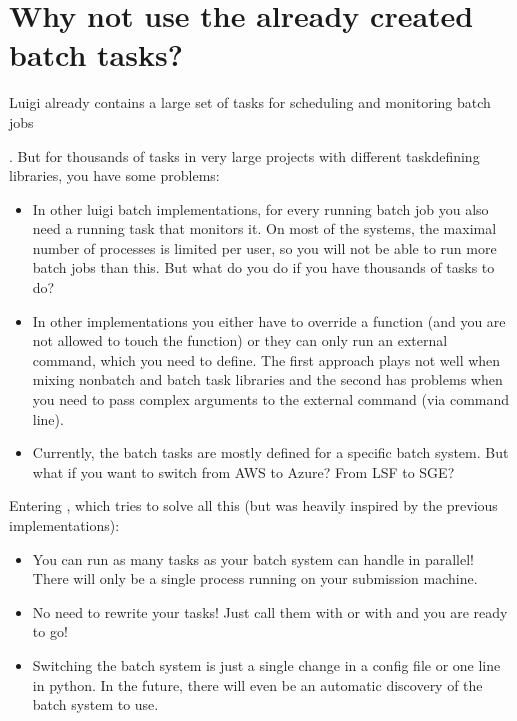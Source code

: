 \documentclass[letterpaper,10pt,english]{sphinxmanual}
\begin{document}
\chapter{Why not use the already created batch tasks?}
\label{\detokenize{index:why-not-use-the-already-created-batch-tasks}}
Luigi already contains a large set of tasks for scheduling and monitoring batch jobs %
\begin{footnote}[1]\sphinxAtStartFootnote
{}
%
\end{footnote}.
But for thousands of tasks in very large projects with different task\sphinxhyphen{}defining libraries, you have some problems:
\begin{itemize}
\item {} 
In other luigi batch implementations, for every running batch job you also need a running task that monitors it.
On most of the systems, the maximal number of processes is limited per user, so you will not be able to run more
batch jobs than this.
But what do you do if you have thousands of tasks to do?

\item {} 
In other implementations you either have to override a  function (and you are not allowed to touch
the  function) or they can only run an external command, which you need to define.
The first approach plays not well when mixing non\sphinxhyphen{}batch and batch task libraries and the second
has problems when you need to pass complex arguments to the external command (via command line).

\item {} 
Currently, the batch tasks are mostly defined for a specific batch system. But what if you want to
switch from AWS to Azure? From LSF to SGE?

\end{itemize}

Entering , which tries to solve all this (but was heavily inspired by the previous implementations):
\begin{itemize}
\item {} 
You can run as many tasks as your batch system can handle in parallel! There will only be a single process running
on your submission machine.

\item {} 
No need to rewrite your tasks! Just call them with  or with
 and you are ready to go!

\item {} 
Switching the batch system is just a single change in a config file or one line in python.
In the future, there will even be an automatic discovery of the batch system to use.

\end{itemize}
\end{document}
